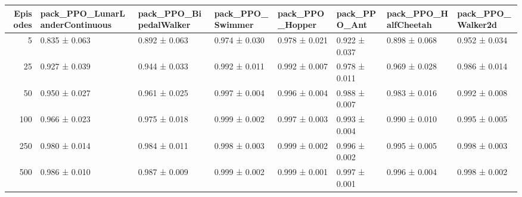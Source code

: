 \begin{tabular}{rlllllll}
\toprule
Episodes & pack_PPO_LunarLanderContinuous & pack_PPO_BipedalWalker & pack_PPO_Swimmer & pack_PPO_Hopper & pack_PPO_Ant & pack_PPO_HalfCheetah & pack_PPO_Walker2d \\
\midrule
5 & 0.835 ± 0.063 & 0.892 ± 0.063 & 0.974 ± 0.030 & 0.978 ± 0.021 & 0.922 ± 0.037 & 0.898 ± 0.068 & 0.952 ± 0.034 \\
25 & 0.927 ± 0.039 & 0.944 ± 0.033 & 0.992 ± 0.011 & 0.992 ± 0.007 & 0.978 ± 0.011 & 0.969 ± 0.028 & 0.986 ± 0.014 \\
50 & 0.950 ± 0.027 & 0.961 ± 0.025 & 0.997 ± 0.004 & 0.996 ± 0.004 & 0.988 ± 0.007 & 0.983 ± 0.016 & 0.992 ± 0.008 \\
100 & 0.966 ± 0.023 & 0.975 ± 0.018 & 0.999 ± 0.002 & 0.997 ± 0.003 & 0.993 ± 0.004 & 0.990 ± 0.010 & 0.995 ± 0.005 \\
250 & 0.980 ± 0.014 & 0.984 ± 0.011 & 0.998 ± 0.003 & 0.999 ± 0.002 & 0.996 ± 0.002 & 0.995 ± 0.005 & 0.998 ± 0.003 \\
500 & 0.986 ± 0.010 & 0.987 ± 0.009 & 0.999 ± 0.002 & 0.999 ± 0.001 & 0.997 ± 0.001 & 0.996 ± 0.004 & 0.998 ± 0.002 \\
\bottomrule
\end{tabular}
